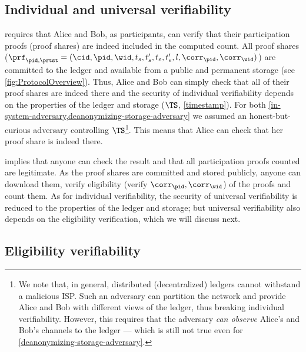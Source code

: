 \subsection{Individual and universal verifiability}%
\label{analysis-individual}%
\label{analysis-universal}

 requires that Alice and Bob, as participants, can verify 
that their participation proofs (\ie proof shares) are indeed included in the 
computed count.
All proof shares (\ie \(\prf_{\pid, \prtst} = (\cid, \pid, \wid, t_s, t_s', 
  t_e, t_e', l, \corr_\pid, \corr_\wid)\)) are committed to the ledger and 
available from a public and permanent storage (see 
\cref{fig:ProtocolOverview}).
Thus, Alice and Bob can simply check that all of their proof shares are indeed 
there and the security of individual verifiability depends on the properties of 
the ledger and storage (\(\TS\), \cref{timestamp}).
For both \cref{in-system-adversary,deanonymizing-storage-adversary} we assumed 
an honest-but-curious adversary controlling \(\TS\)\footnote{%
  We note that, in general, distributed (decentralized) ledgers cannot 
  withstand a malicious \ac{ISP}.
  Such an adversary can partition the network and provide Alice and Bob with 
  different views of the ledger, thus breaking individual verifiability.
  However, this requires that the adversary \emph{can observe} Alice's and 
  Bob's channels to the ledger --- which is still not true even for 
  \cref{deanonymizing-storage-adversary}.
}.
This means that Alice can check that her proof share is indeed there.

 implies that anyone can check the result and that all 
participation proofs counted are legitimate.
As the proof shares are committed and stored publicly, anyone can
download them, verify eligibility (\ie verify \(\corr_\pid,
\corr_{\wid}\)) of the proofs and count them.
As for individual verifiability, the security of universal verifiability is 
reduced to the properties of the ledger and storage; but universal 
verifiability also depends on the eligibility verification, which we will 
discuss next.

\subsection{Eligibility verifiability}%
\label{analysis-eligibility}

